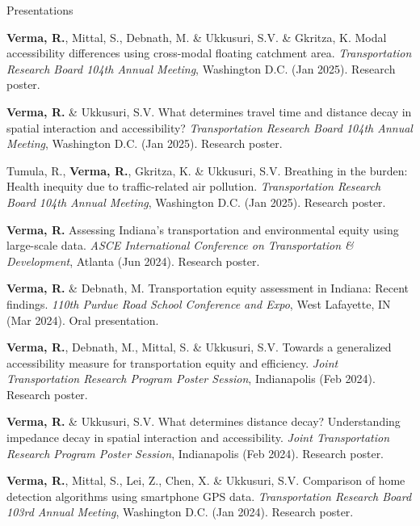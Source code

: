 \documentclass{CV} %
\begin{document}
\begin{rSection}{Presentations}
    \begin{etaremune}
        \item \textbf{Verma, R.}, Mittal, S., Debnath, M. \& Ukkusuri, S.V. \& Gkritza, K. Modal accessibility differences using cross-modal floating catchment area. \textit{Transportation Research Board 104th Annual Meeting}, Washington D.C. (Jan 2025). Research poster.
        
        \item \textbf{Verma, R.} \& Ukkusuri, S.V. What determines travel time and distance decay in spatial interaction and accessibility? \textit{Transportation Research Board 104th Annual Meeting}, Washington D.C. (Jan 2025). Research poster.

        \item Tumula, R., \textbf{Verma, R.}, Gkritza, K. \& Ukkusuri, S.V. Breathing in the burden: Health inequity due to traffic-related air pollution. \textit{Transportation Research Board 104th Annual Meeting}, Washington D.C. (Jan 2025). Research poster.
        
        \item \textbf{Verma, R.} Assessing Indiana's transportation and environmental equity using large-scale data. \textit{ASCE International Conference on Transportation \& Development}, Atlanta (Jun 2024). Research poster.

        \item \textbf{Verma, R.} \& Debnath, M. Transportation equity assessment in Indiana: Recent findings. \textit{110th Purdue Road School Conference and Expo}, West Lafayette, IN (Mar 2024). Oral presentation.
        
        \item \textbf{Verma, R.}, Debnath, M., Mittal, S. \& Ukkusuri, S.V. Towards a generalized accessibility measure for transportation equity and efficiency. \textit{Joint Transportation Research Program Poster Session}, Indianapolis (Feb 2024). Research poster.
        
        \item \textbf{Verma, R.} \& Ukkusuri, S.V. What determines distance decay? Understanding impedance decay in spatial interaction and accessibility. \textit{Joint Transportation Research Program Poster Session}, Indianapolis (Feb 2024). Research poster.

        \item \textbf{Verma, R.}, Mittal, S., Lei, Z., Chen, X. \& Ukkusuri, S.V. Comparison of home detection algorithms using smartphone GPS data. \textit{Transportation Research Board 103rd Annual Meeting}, Washington D.C. (Jan 2024). Research poster.


\end{etaremune}
\end{rSection}
\end{document}
